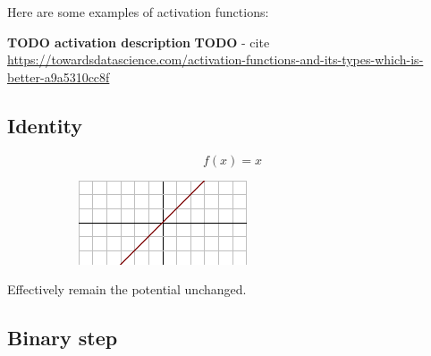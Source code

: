 Here are some examples of activation functions:

\textbf{TODO activation description}
\textbf{TODO} - cite \url{https://towardsdatascience.com/activation-functions-and-its-types-which-is-better-a9a5310cc8f}

\subsection*{Identity}

\begin{figure}[H]
\raggedright
\begin{subfigure}{.25\textwidth}
  \centering
  \[ f(x) = x \]
\end{subfigure}%
\begin{subfigure}{.25\textwidth}
  \centering
  \includegraphics[width=\textwidth]{tex/images/activation/identity}
\end{subfigure}
\end{figure}

\noindent
Effectively remain the potential unchanged. 

\subsection*{Binary step}

